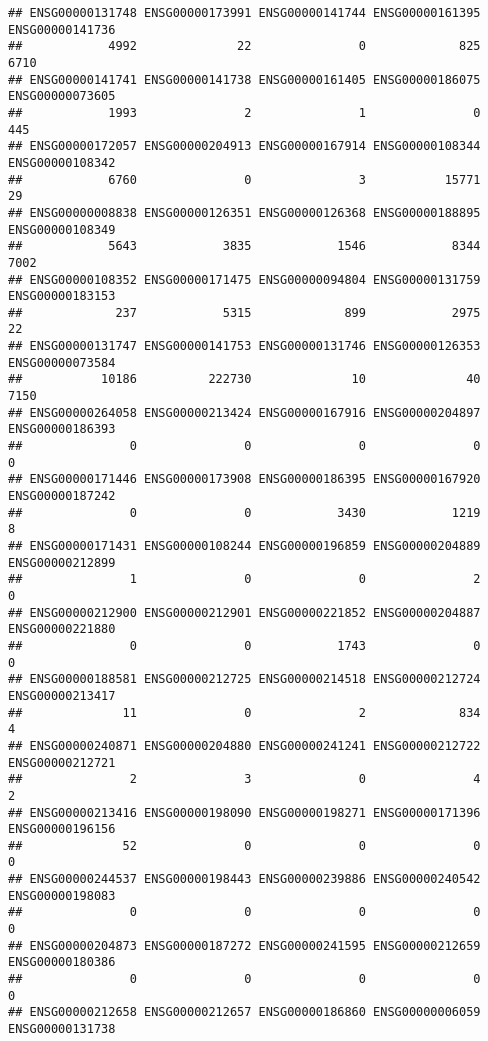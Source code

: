 \documentclass[
]{article}
\begin{document}
\begin{verbatim}
## ENSG00000131748 ENSG00000173991 ENSG00000141744 ENSG00000161395 ENSG00000141736 
##            4992              22               0             825            6710 
## ENSG00000141741 ENSG00000141738 ENSG00000161405 ENSG00000186075 ENSG00000073605 
##            1993               2               1               0             445 
## ENSG00000172057 ENSG00000204913 ENSG00000167914 ENSG00000108344 ENSG00000108342 
##            6760               0               3           15771              29 
## ENSG00000008838 ENSG00000126351 ENSG00000126368 ENSG00000188895 ENSG00000108349 
##            5643            3835            1546            8344            7002 
## ENSG00000108352 ENSG00000171475 ENSG00000094804 ENSG00000131759 ENSG00000183153 
##             237            5315             899            2975              22 
## ENSG00000131747 ENSG00000141753 ENSG00000131746 ENSG00000126353 ENSG00000073584 
##           10186          222730              10              40            7150 
## ENSG00000264058 ENSG00000213424 ENSG00000167916 ENSG00000204897 ENSG00000186393 
##               0               0               0               0               0 
## ENSG00000171446 ENSG00000173908 ENSG00000186395 ENSG00000167920 ENSG00000187242 
##               0               0            3430            1219               8 
## ENSG00000171431 ENSG00000108244 ENSG00000196859 ENSG00000204889 ENSG00000212899 
##               1               0               0               2               0 
## ENSG00000212900 ENSG00000212901 ENSG00000221852 ENSG00000204887 ENSG00000221880 
##               0               0            1743               0               0 
## ENSG00000188581 ENSG00000212725 ENSG00000214518 ENSG00000212724 ENSG00000213417 
##              11               0               2             834               4 
## ENSG00000240871 ENSG00000204880 ENSG00000241241 ENSG00000212722 ENSG00000212721 
##               2               3               0               4               2 
## ENSG00000213416 ENSG00000198090 ENSG00000198271 ENSG00000171396 ENSG00000196156 
##              52               0               0               0               0 
## ENSG00000244537 ENSG00000198443 ENSG00000239886 ENSG00000240542 ENSG00000198083 
##               0               0               0               0               0 
## ENSG00000204873 ENSG00000187272 ENSG00000241595 ENSG00000212659 ENSG00000180386 
##               0               0               0               0               0 
## ENSG00000212658 ENSG00000212657 ENSG00000186860 ENSG00000006059 ENSG00000131738 

\end{verbatim}
\end{document}

